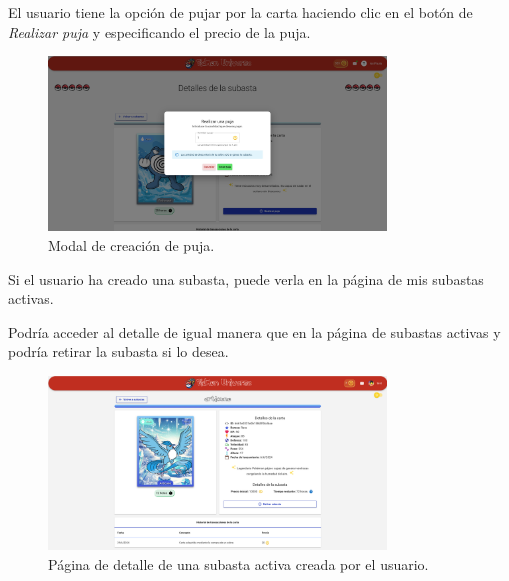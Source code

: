 El usuario tiene la opción de pujar por la carta haciendo clic en el botón de \textit{Realizar puja} y especificando el precio de la puja.
\begin{figure}[H]
    \centering
    \includegraphics[width=0.8\textwidth]{figures/6-Analisis/6-Interfaz/interfaz/crear-puja.png}
    \caption{Modal de creación de puja.}
    \label{fig:m-interfaz-puja}
\end{figure}


Si el usuario ha creado una subasta, puede verla en la página de mis subastas activas.


Podría acceder al detalle de igual manera que en la página de subastas activas
y podría retirar la subasta si lo desea.

\begin{figure}[H]
    \centering
    \includegraphics[width=0.8\textwidth]{figures/6-Analisis/6-Interfaz/interfaz/mi_subasta_detalle.png}
    \caption{Página de detalle de una subasta activa creada por el usuario.}
    \label{fig:m-interfaz-detalle-mi-subasta}
\end{figure}


